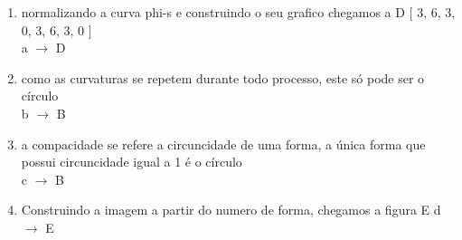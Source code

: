 \begin{question}
    
    \begin{enumerate}[label=\textbf{\alph*)}]
        \item normalizando a curva phi-s e construindo o seu grafico chegamos a D
        [ 3, 6, 3, 0, 3, 6, 3, 0 ] \\
        a $\rightarrow$ D
        \item como as curvaturas se repetem durante 
        todo processo, este só pode ser o círculo \\ 
        b $\rightarrow$ B
        \item a compacidade se refere a circuncidade 
        de uma forma, a única forma que possui circuncidade 
        igual a 1 é o círculo \\ 
        c $\rightarrow$ B 
        \item Construindo a imagem a partir do numero de forma, chegamos a figura E
        d $\rightarrow$ E
    \end{enumerate}
\end{question}